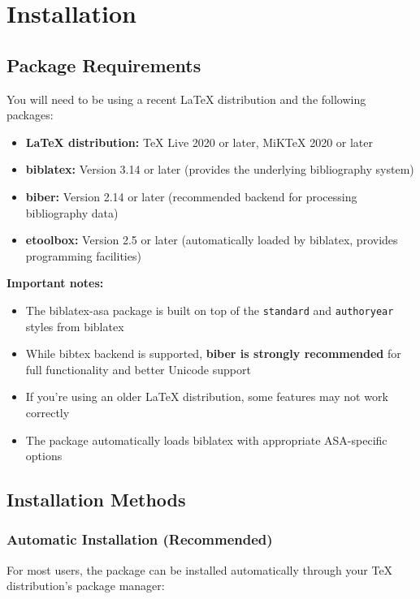 \documentclass[11pt,a4paper]{ltxdoc}
\begin{document}
\section{Installation}

\subsection{Package Requirements}

You will need to be using a recent LaTeX distribution and the following packages:

\begin{itemize}
  \item \textbf{LaTeX distribution:} TeX Live 2020 or later, MiKTeX 2020 or later
  \item \textbf{biblatex:} Version 3.14 or later (provides the underlying bibliography system)
  \item \textbf{biber:} Version 2.14 or later (recommended backend for processing bibliography data)
  \item \textbf{etoolbox:} Version 2.5 or later (automatically loaded by biblatex, provides programming facilities)
\end{itemize}

\textbf{Important notes:}
\begin{itemize}
  \item The \textsf{biblatex-asa} package is built on top of the \texttt{standard} and \texttt{authoryear} styles from biblatex
  \item While bibtex backend is supported, \textbf{biber is strongly recommended} for full functionality and better Unicode support
  \item If you're using an older LaTeX distribution, some features may not work correctly
  \item The package automatically loads biblatex with appropriate ASA-specific options
\end{itemize}

\subsection{Installation Methods}

\subsubsection{Automatic Installation (Recommended)}

For most users, the package can be installed automatically through your TeX distribution's package manager:
\end{document}
